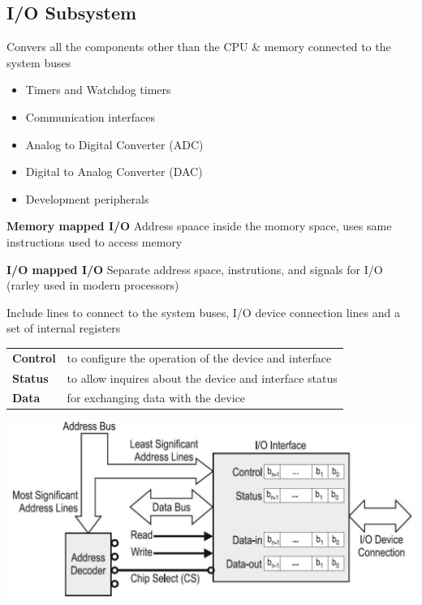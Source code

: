 \subsection{I/O Subsystem}
Convers all the components other than the CPU \& memory connected to the system buses
\begin{itemize}
    \item Timers and Watchdog timers
    \item Communication interfaces
    \item Analog to Digital Converter (ADC)
    \item Digital to Analog Converter (DAC)
    \item Development peripherals
\end{itemize}
\begin{multicols}{2}
    \begin{minipage}{\linewidth}
        \textbf{Memory mapped I/O}\newline
        Address spaace inside the momory space, uses same instructions used to access memory
    \end{minipage}
    
    \begin{minipage}{\linewidth}
        \textbf{I/O mapped I/O} \newline
        Separate address space, instrutions, and signals for I/O (rarley used in modern processors)
    \end{minipage}
\end{multicols}

    \begin{minipage}{0.6\linewidth}%
        \raggedright
        Include lines to connect to the system buses, I/O device connection lines and a set of internal registers
        \begin{tabular}{ll}
           \textbf{Control}  & to configure the operation of the device and interface  \\  
           \textbf{Status}   & to allow inquires about the device and interface status  \\ 
           \textbf{Data}     & for exchanging data with the device \\ 
        \end{tabular} 
    \end{minipage}
    \begin{minipage}{0.4\linewidth}
        \includegraphics[width=\linewidth]{images/IOAnatomy} 
    \end{minipage}
   
\clearpage

